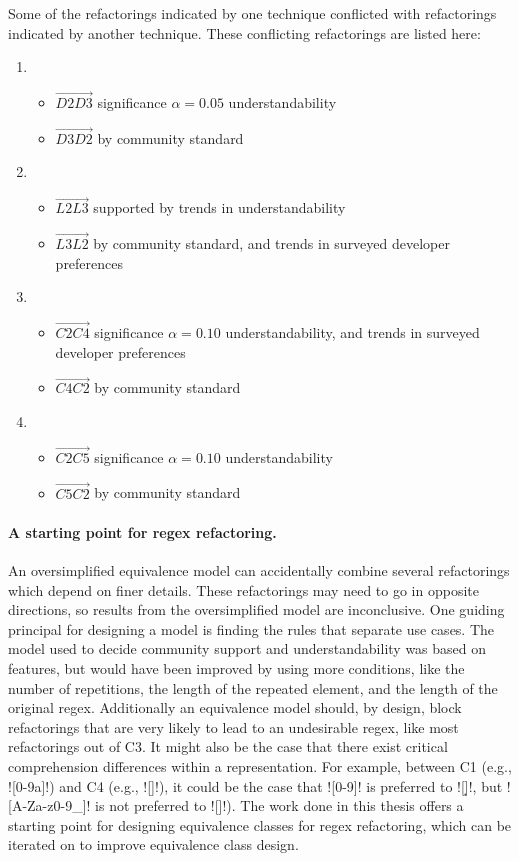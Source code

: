 Some of the refactorings indicated by one technique conflicted with refactorings indicated by another technique.  These conflicting refactorings are listed here:
\begin{enumerate}
\item \begin{itemize}
\item   $\overrightarrow{D2 D3}$ significance $\alpha=0.05$ understandability
\item   $\overrightarrow{D3 D2}$ by community standard
\end{itemize}
\item \begin{itemize}
\item   $\overrightarrow{L2 L3}$ supported by trends in understandability
\item   $\overrightarrow{L3 L2}$ by community standard, and trends in surveyed developer preferences
\end{itemize}
\item \begin{itemize}
\item   $\overrightarrow{C2 C4}$ significance $\alpha=0.10$ understandability, and trends in surveyed developer preferences
\item   $\overrightarrow{C4 C2}$ by community standard
\end{itemize}
\item \begin{itemize}
\item   $\overrightarrow{C2 C5}$ significance $\alpha=0.10$ understandability
\item   $\overrightarrow{C5 C2}$ by community standard
\end{itemize}
\end{enumerate}


\paragraph{A starting point for regex refactoring.}  An oversimplified equivalence model can accidentally combine several refactorings which depend on finer details.  These refactorings may need to go in opposite directions, so results from the oversimplified model are inconclusive.  One guiding principal for designing a model is finding the rules that separate use cases.  The model used to decide community support and understandability was based on features, but would have been improved by using more conditions, like the number of repetitions, the length of the repeated element, and the length of the original regex.  Additionally an equivalence model should, by design, block refactorings that are very likely to lead to an undesirable regex, like most refactorings out of C3.  It might also be the case that there exist critical comprehension differences within a representation. For example, between C1 (e.g., \cverb![0-9a]!) and C4 (e.g., \cverb![\da]!), it could be the case that \cverb![0-9]! is preferred to \cverb![\d]!, but \cverb![A-Za-z0-9_]! is not preferred to \cverb![\w]!). The work done in this thesis offers a starting point for designing equivalence classes for regex refactoring, which can be iterated on to improve equivalence class design.

